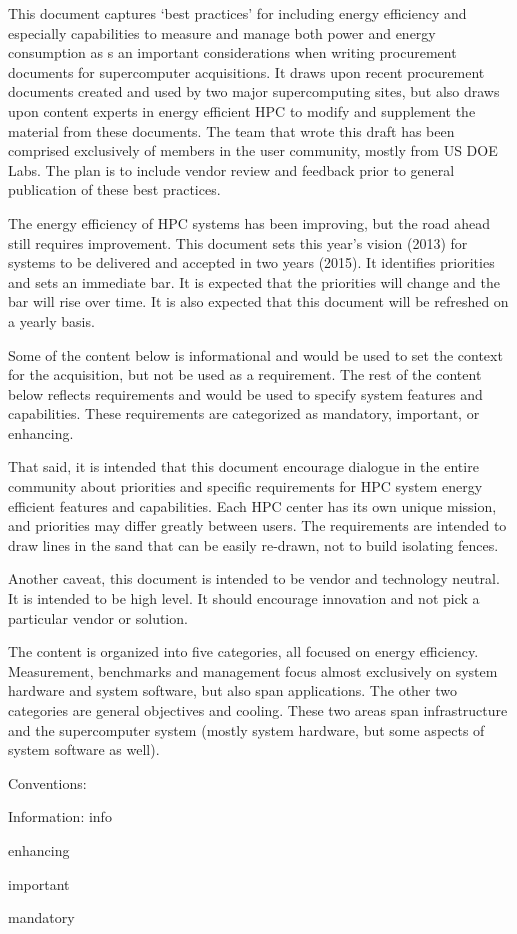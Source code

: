 This document captures ‘best practices’ for including energy efficiency and especially capabilities to measure and manage both power and energy consumption as s an important considerations when writing procurement documents for supercomputer acquisitions.  It draws upon recent procurement documents created and used by two major supercomputing sites, but also draws upon content experts in energy efficient HPC to modify and supplement the material from these documents.  The team that wrote this draft has been comprised exclusively of members in the user community, mostly from US DOE Labs.  The plan is to include vendor review and feedback prior to general publication of these best practices.

The energy efficiency of HPC systems has been improving, but the road ahead still requires improvement.  This document sets this year’s vision (2013) for systems to be delivered and accepted in two years (2015).  It identifies priorities and sets an immediate bar.  It is expected that the priorities will change and the bar will rise over time.  It is also expected that this document will be refreshed on a yearly basis.

Some of the content below is informational and would be used to set the context for the acquisition, but not be used as a requirement.  The rest of the content below reflects requirements and would be used to specify system features and capabilities.  These requirements are categorized as mandatory, important, or enhancing. 

That said, it is intended that this document encourage dialogue in the entire community about priorities and specific requirements for HPC system energy efficient features and capabilities. Each HPC center has its own unique mission, and priorities may differ greatly between users. The requirements are intended to draw lines in the sand that can be easily re-drawn, not to build isolating fences. 

Another caveat, this document is intended to be vendor and technology neutral.  It is intended to be high level.  It should encourage innovation and not pick a particular vendor or solution.  

The content is organized into five categories, all focused on energy efficiency.  Measurement, benchmarks and management focus almost exclusively on system hardware and system software, but also span applications.  The other two categories are general objectives and cooling.  These two areas span infrastructure and the supercomputer system (mostly system hardware, but some aspects of system software as well). 

Conventions:

Information: info

\begin{packed_enum}
\item
enhancing
\item
important
\item
mandatory
\end{packed_enum}

